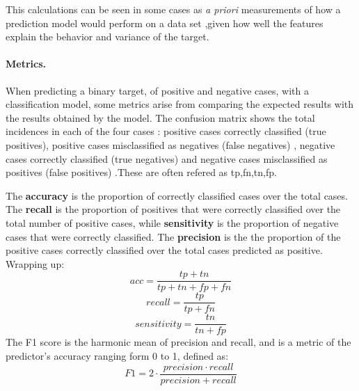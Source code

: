 \documentclass{article}
\begin{document}
This calculations can be seen in some cases as  \textit{a priori} measurements of how a prediction model would perform  on a data set ,given how well the features explain the behavior and variance of the target.



\paragraph{Metrics.} When predicting a binary target, of positive and negative cases, with a classification model, some metrics arise from comparing the expected results with the results obtained by the model. The confusion matrix shows the total incidences in each of the four cases : positive cases correctly classified (true positives), positive cases misclassified as negatives (false negatives) , negative cases correctly classified (true negatives) and negative cases misclassified as positives (false positives) .These are often refered as tp,fn,tn,fp.

The \textbf{accuracy} is the proportion of correctly classified cases over the total cases. The \textbf{recall} is the proportion of positives that were correctly classified over the total number of positive cases, while \textbf{sensitivity} is the proportion of negative cases that were correctly classified. The \textbf{precision} is the the proportion of the positive cases correctly classified over the total cases predicted as positive. Wrapping up:
\begin{equation}
    acc =  \frac{tp+tn}{tp+tn+fp+fn}
\end{equation}
\begin{equation}
    recall =  \frac{tp}{tp+fn} 
\end{equation}
\begin{equation}
    sensitivity =  \frac{tn}{tn+fp} 
\end{equation}
The F1 score is the harmonic mean of precision and recall, and is a metric of the predictor's accuracy ranging form 0 to 1, defined as:
\begin{equation}
    F1 = 2\cdot \frac{precision \cdot recall}{precision + recall}
\end{equation}
\end{document}
